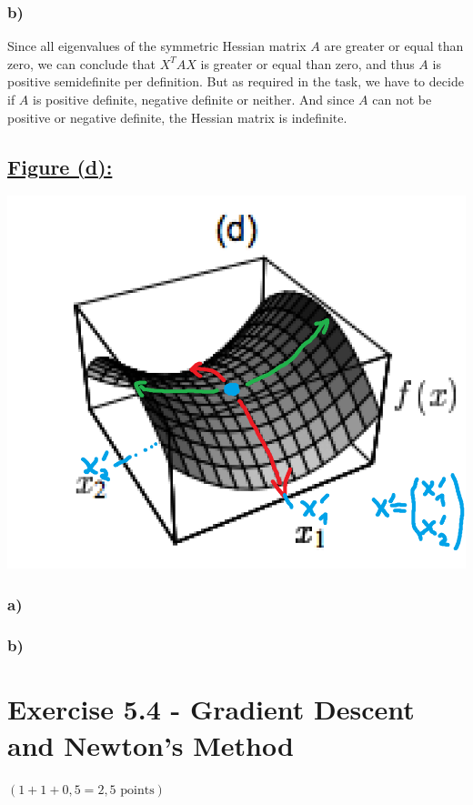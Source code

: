 \documentclass[a4paper]{article}
\begin{document}
        \subsubsection*{b)}
            Since all eigenvalues of the symmetric Hessian matrix $A$ are greater or equal than zero, we can conclude that $X^T A X$ is greater or equal than zero, and thus $A$ is positive semidefinite per definition.
            But as required in the task, we have to decide if $A$ is positive definite, negative definite or neither.
            And since $A$ can not be positive or negative definite, the Hessian matrix is indefinite.


\newpage
    \subsection*{\underline{Figure (d):}}
        \includegraphics[width=0.8\linewidth]{Assignment 5/4.png}
        \subsubsection*{a)}
        
        \subsubsection*{b)}
            
            




\newpage
\section*{Exercise 5.4 - Gradient Descent and Newton's Method}
$(1+1+0,5 = 2,5 \text{ points})$
\end{document}
